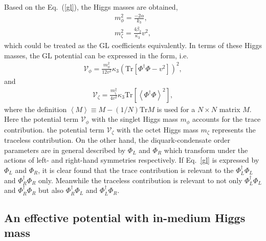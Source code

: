 \documentclass[12pt]{article}
\begin{document}
Based on the Eq.~(\ref{gl}), the Higgs
masses are obtained,
\begin{eqnarray}
m_\phi^2=\frac{-2\alpha}{k_3},\\ m_\zeta^2=\frac{4\beta_2}{\kappa_3}
	v^2,\label{mhiggs}
\end{eqnarray}
which could be treated as the GL coefficients equivalently. In terms of these Higgs masses, the GL
potential can be expressed in the form, i.e.
\begin{eqnarray}
\mathcal{V}_\phi=
\frac{m_\phi^2}{12v^2}\kappa_3(\text{Tr}[\Phi^\dagger\Phi-v^2])^2,
\label{glmphi}
\end{eqnarray}
and
\begin{eqnarray}
\mathcal{V}_\zeta=
\frac{m_\zeta^2}{4v^2}\kappa_3\text{Tr}\left[\left<\Phi^\dagger\Phi\right>^2\right],
\label{glzeta}
\end{eqnarray}
where the definition $\left<M\right>\equiv M-(1/N)\text{Tr}M$ is used for a $N\times N$ matrix $M$.
Here the potential term $\mathcal{V}_\phi$ with the singlet Higgs mass $m_{\phi}$ accounts for the trace contribution.
the potential term $\mathcal{V}_\zeta$ with the octet Higgs mass $m_{\zeta}$ represents the traceless contribution.
On the other hand, the diquark-condensate order parameters are in general described by $\Phi_L$ and $\Phi_R$ which
transform under the actions of left- and right-hand symmetries respectively.
If Eq.~\eqref{gl} is expressed by $\Phi_L$ and $\Phi_R$, it is clear found that the trace contribution is relevant to the $\Phi_L^\dagger\Phi_L$ and $\Phi_R^\dagger\Phi_R$ only.
Meanwhile the traceless contribution is relevant to not only $\Phi_L^\dagger\Phi_L$ and $\Phi_R^\dagger\Phi_R$ 
but also $\Phi_R^\dagger\Phi_L$ and $\Phi_L^\dagger\Phi_R$.








\subsection{An effective potential with in-medium Higgs mass}
\label{sssec:2}
\end{document}
